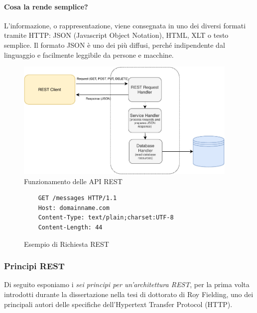 \paragraph{Cosa la rende semplice?} L'informazione, o rappresentazione, viene consegnata in uno dei diversi formati tramite HTTP: JSON (Javascript Object Notation), HTML, XLT o testo semplice. Il formato JSON è uno dei più diffusi, perché indipendente dal linguaggio e facilmente leggibile da persone e macchine.
\begin{figure}[H]
    \centering
    \includegraphics[width=0.95\textwidth]{images/01_10_restapi.pdf}
    \caption{Funzionamento delle API REST}
    \label{fig:restapi}
\end{figure}
\begin{figure}[H]
    \begin{verbatim}
    GET /messages HTTP/1.1
    Host: domainname.com
    Content-Type: text/plain;charset:UTF-8
    Content-Length: 44
\end{verbatim}
    \caption{Esempio di Richiesta REST}
    \label{fig:restrequest}
\end{figure}

\subsubsection{Principi REST}
Di seguito esponiamo i \textit{sei principi per un'architettura REST}, per la prima volta introdotti durante la dissertazione nella tesi di dottorato di Roy Fielding, uno dei principali autori delle specifiche dell'Hypertext Transfer Protocol (HTTP). \cite{fielding:restprinciples}

